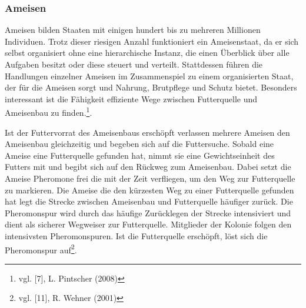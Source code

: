 \documentclass[a4paper, 11pt]{article}
\begin{document}
\subsubsection{Ameisen}
Ameisen bilden Staaten mit einigen hundert bis zu mehreren Millionen Individuen. Trotz dieser riesigen Anzahl funktioniert ein Ameisenstaat, da er sich selbst organisiert ohne eine hierarchische Instanz, die einen Überblick über alle Aufgaben besitzt oder diese steuert und verteilt. Stattdessen führen die Handlungen einzelner Ameisen im Zusammenspiel zu einem organisierten Staat, der für die Ameisen sorgt und Nahrung, Brutpflege und Schutz bietet. Besonders interessant ist die Fähigkeit effiziente Wege zwischen Futterquelle und Ameisenbau zu finden.\footnote{vgl. [7], L. Pintscher (2008)}.
\par Ist der Futtervorrat des Ameisenbaus erschöpft verlassen mehrere Ameisen den Ameisenbau gleichzeitig und begeben sich auf die Futtersuche. Sobald eine Ameise eine Futterquelle gefunden hat, nimmt sie eine Gewichtseinheit des Futters mit und begibt sich auf den Rückweg zum Ameisenbau. Dabei setzt die Ameise Pheromone frei die mit der Zeit verfliegen, um den Weg zur Futterquelle zu markieren. Die Ameise die den kürzesten Weg zu einer Futterquelle gefunden hat legt die Strecke zwischen Ameisenbau und Futterquelle häufiger zurück.  Die Pheromonspur wird durch das häufige Zurücklegen der Strecke intensiviert und dient als sicherer Wegweiser zur Futterquelle. Mitglieder der Kolonie folgen den intensivsten Pheromonspuren. Ist die Futterquelle erschöpft, löst sich die Pheromonspur auf\footnote{vgl. [11], R. Wehner (2001)}.
\end{document}
